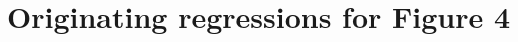 \documentclass[10pt,landscape]{article}
\begin{document}
\section{Originating regressions for Figure 4}

\clearpage

\clearpage

\clearpage

\clearpage


\clearpage


\clearpage


\clearpage


\clearpage


% 

% 

% 

% 

% 

% 

% 

% 

% 

% 

% 

% 

% 

% 

% 

% 

% 

% 
\end{document}
